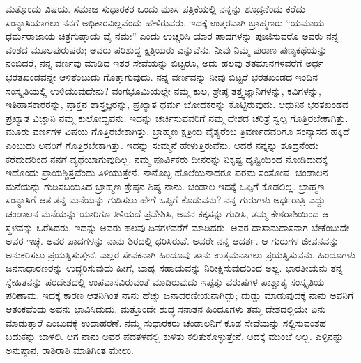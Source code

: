 ಮತ್ತೊಂದು ವಿಷಯ. ಸಮಾಜ ಸುಧಾರಕರ ಒಂದು ಮಾಸ ಪತ್ರಿಕೆಯಲ್ಲಿ ನನ್ನನ್ನು ಶೂದ್ರನೆಂದು ಕರೆದು ಸಂನ್ಯಾಸಿಯಾಗಲು ನನಗೆ ಅಧಿಕಾರವಿಲ್ಲವೆಂದು ಹೇಳಿರುವರು. ಇದಕ್ಕೆ ಉತ್ತರವಾಗಿ ಬ್ರಾಹ್ಮಣರು “ಯಮಾಯ ಧರ್ಮರಾಜಾಯ ಚಿತ್ರಗುಪ್ತಾಯ ವೈ ನಮಃ” ಎಂದು ಉಚ್ಚರಿಸಿ ಯಾರ ಪಾದಗಳನ್ನು ಪೂಜಿಸುವರೊ ಅವರು ನನ್ನ ವಂಶದ ಮೂಲಪುರುಷರು; ಅವರು ಪರಿಶುದ್ಧ ಕ್ಷತ್ರಿಯರು ಎನ್ನುವೆನು. ನೀವು ನಿಮ್ಮ ಪುರಾಣ ಪುಣ್ಯಕಥೆಯನ್ನು ನಂಬಿದರೆ, ನನ್ನ ವರ್ಣವು ಮಾಡಿದ ಇತರ ಸೇವೆಯನ್ನು ಬಿಟ್ಟರೂ, ಅದು ಹಲವು ಶತಮಾನಗಳವರೆಗೆ ಅರ್ಧ ಭರತಖಂಡವನ್ನೇ ಆಳಿತೆಂಬುದು ಗೊತ್ತಾಗುವುದು. ನನ್ನ ವರ್ಣವನ್ನು ನೀವು ಬಿಟ್ಟರೆ ಭರತಖಂಡದ ಇಂದಿನ ಸಂಸ್ಕೃತಿಯಲ್ಲಿ ಉಳಿಯುವುದೇನು? ವಂಗಭೂಮಿಯಲ್ಲೇ ನಮ್ಮ ಕುಲ, ಶ್ರೇಷ್ಠ ತತ್ತ್ವಜ್ಞಾನಿಗಳನ್ನು, ಕವಿಗಳನ್ನು, ಇತಿಹಾಸಕಾರರನ್ನು, ಪ್ರಾಕ್ತನ ಶಾಸ್ತ್ರಜ್ಞರನ್ನು, ಪ್ರಖ್ಯಾತ ಧರ್ಮ ಬೋಧಕರನ್ನು ಕೊಟ್ಟಿರುವುದು. ಆಧುನಿಕ ಭರತಖಂಡದ ಪ್ರಖ್ಯಾತ ವಿಜ್ಞಾನಿ ನಮ್ಮ ಕುಲೋದ್ಭವನು. ಇದನ್ನು ಚರ್ಚಿಸುವವರಿಗೆ ನಮ್ಮ ದೇಶದ ಚರಿತ್ರೆ ಸ್ವಲ್ಪ ಗೊತ್ತಿರಬೇಕಾಗಿತ್ತು. ಮೂರು ವರ್ಣಗಳ ವಿಷಯ ಗೊತ್ತಿರಬೇಕಾಗಿತ್ತು. ಬ್ರಾಹ್ಮಣ ಕ್ಷತ್ರಿಯ ವೈಶ್ಯರೆಂಬ ತ್ರಿವರ್ಣದವರಿಗೂ ಸಂನ್ಯಾಸದ ಹಕ್ಕಿದೆ ಎಂಬುದು ಅವರಿಗೆ ಗೊತ್ತಿರಬೇಕಾಗಿತ್ತು. ಇದನ್ನು ಸುಮ್ಮನೆ ಹೇಳುತ್ತಿರುವೆನು. ಆದರೆ ನನ್ನನ್ನು ಶೂದ್ರನೆಂದು ಕರೆದುದರಿಂದ ನನಗೆ ವ್ಯಥೆಯಾಗುವುದಿಲ್ಲ. ನಮ್ಮ ಪೂರ್ವಿಕರು ದೀನರನ್ನು ನಿಕೃಷ್ಟ ದೃಷ್ಟಿಯಿಂದ ನೋಡಿದುದಕ್ಕೆ ಇದೊಂದು ಪ್ರಾಯಶ್ಚಿತ್ತವೆಂದು ತಿಳಿಯುತ್ತೇನೆ. ನಾನೊಬ್ಬ ಹೊಲೆಯನಾದರೂ ಪರಮ ಸಂತೋಷ. ಚಂಡಾಲನ ಮನೆಯನ್ನು ಗುಡಿಸಬಯಸಿದ ಬ್ರಾಹ್ಮಣ ಶ್ರೇಷ್ಠನ ಶಿಷ್ಯ ನಾನು. ಚಂಡಾಲ ಇದಕ್ಕೆ ಒಪ್ಪಿಗೆ ಕೊಡಲಿಲ್ಲ. ಬ್ರಾಹ್ಮಣ ಸಂನ್ಯಾಸಿಗೆ ಆತ ತನ್ನ ಮನೆಯನ್ನು ಗುಡಿಸಲು ಹೇಗೆ ಒಪ್ಪಿಗೆ ಕೊಡುವನು? ನನ್ನ ಗುರುಗಳು ಅರ್ಧರಾತ್ರಿ ಎದ್ದು ಚಂಡಾಲನ ಮನೆಯನ್ನು ಯಾರಿಗೂ ತಿಳಿಯದೆ ಪ್ರವೇಶಿಸಿ, ಅವನ ಕಕ್ಕಸನ್ನು ಗುಡಿಸಿ, ತಮ್ಮ ಕೇಶರಾಶಿಯಿಂದ ಆ ಸ್ಥಳವನ್ನು ಒರೆಸಿದರು. ಇದನ್ನು ಅವರು ಹಲವು ದಿನಗಳವರೆಗೆ ಮಾಡಿದರು. ಅವರ ದಾಸಾನುದಾಸನಾಗ ಬೇಕೆಂಬುದೇ ಅವರ ಇಚ್ಛೆ. ಅವರ ಪಾದಗಳನ್ನು ನಾನು ಶಿರದಲ್ಲಿ ಧರಿಸಿರುವೆ. ಅವರೇ ನನ್ನ ಆದರ್ಶ. ಆ ಗುರುಗಳ ಜೀವನವನ್ನು ಅನುಕರಿಸಲು ಪ್ರಯತ್ನಿಸುತ್ತೇನೆ. ಎಲ್ಲರ ಸೇವಕನಾಗಿ ಹಿಂದೂವು ತಾನು ಉತ್ತಮನಾಗಲು ಪ್ರಯತ್ನಿಸುವನು. ಹಿಂದೂಗಳು ಜನಸಾಧಾರಣರನ್ನು ಉದ್ಧರಿಸುವುದು ಹೀಗೆ, ಬಾಹ್ಯ ಸಹಾಯವನ್ನು ನಿರೀಕ್ಷಿಸುವುದರಿಂದ ಅಲ್ಲ. ಭಾರತೀಯನು ತನ್ನ ಸ್ನೇಹಿತನನ್ನು ಪರದೇಶದಲ್ಲಿ ಉಪವಾಸವಿರುವಂತೆ ಮಾಡಿರುವುದು ಇಪ್ಪತ್ತು ವರುಷಗಳ ಪಾಶ್ಚಾತ್ಯ ಸಂಸ್ಕೃತಿಯ ಪರಿಣಾಮ. ಇದಕ್ಕೆ ಕಾರಣ ಆತನಿಗಿಂತ ನಾನು ಹೆಚ್ಚು ಜನಾದರಣೀಯನಾಗಿದ್ದು; ದುಡ್ಡು ಮಾಡುವುದಕ್ಕೆ ನಾನು ಅವನಿಗೆ ಆತಂಕವೆಂದು ಅವನು ಭಾವಿಸಿದುದು. ಮತ್ತೊಂದೇ ಶುದ್ಧ ಸನಾತನ ಹಿಂದೂಗಳು ತಮ್ಮ ದೇಶದಲ್ಲಿಯೇ ಏನು ಮಾಡುತ್ತಾರೆ ಎಂಬುದಕ್ಕೆ ಉದಾಹರಣೆ. ನಮ್ಮ ಸುಧಾರಕರು ಚಂಡಾಲನಿಗೆ ಕೂಡ ಸೇವೆಯನ್ನು ಸಲ್ಲಿಸುವಂತಹ ಬದುಕನ್ನು ಬಾಳಲಿ. ಆಗ ನಾನು ಅವರ ಪದತಳದಲ್ಲಿ ಕುಳಿತು ಕಲಿತುಕೊಳ್ಳುತ್ತೇನೆ. ಅದಕ್ಕೆ ಮುಂಚೆ ಅಲ್ಲ. ಎಳ್ಳಿನಷ್ಟು ಅನುಷ್ಠಾನ, ರಾಶಿರಾಶಿ ಮಾತಿಗಿಂತ ಮೇಲು.

